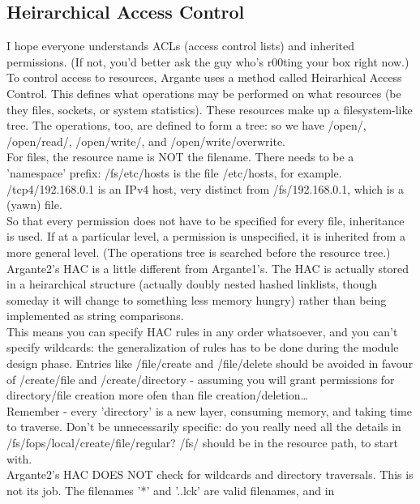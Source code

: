 \documentclass[a4paper,oneside,openany]{book}
\begin{document}
\subsection{Heirarchical Access Control}
I hope everyone understands ACLs (access control lists) and inherited permissions.
(If not, you'd better ask the guy who's r00ting your box right now.)
\smallskip\\
To control access to resources, Argante uses a method called Heirarhical
Access Control. This defines what operations may be performed on what
resources (be they files, sockets, or system statistics). These resources
make up a filesystem-like tree. The operations, too, are defined to form
a tree: so we have /open/, /open/read/, /open/write/, and
/open/write/overwrite.
\smallskip\\
For files, the resource name is NOT the filename. There needs to be a
'namespace' prefix: /fs/etc/hosts is the file /etc/hosts, for example.
/tcp4/192.168.0.1 is an IPv4 host, very distinct from /fs/192.168.0.1,
which is a (yawn) file.
\smallskip\\
So that every permission does not have to be specified for every file,
inheritance is used. If at a particular level, a permission is unspecified,
it is inherited from a more general level. (The operations tree is searched
before the resource tree.)
\smallskip\\
Argante2's HAC is a little different from Argante1's. The HAC is actually
stored in a heirarchical structure (actually doubly nested hashed linklists,
though someday it will change to something less memory hungry) rather than
being implemented as string comparisons.
\smallskip\\
This means you can specify HAC rules in any order whatsoever, and you can't
specify wildcards: the generalization of rules has to be done during the
module design phase. Entries like /file/create and /file/delete should be
avoided in favour of /create/file and /create/directory - assuming you will
grant permissions for directory/file creation more ofen than file
creation/deletion\ldots
\smallskip\\
Remember - every 'directory' is a new layer, consuming memory, and taking
time to traverse. Don't be unnecessarily specific: do you really need all
the details in /fs/fops/local/create/file/regular? /fs/ should be in the
resource path, to start with.
\smallskip\\
Argante2's HAC DOES NOT check for wildcards and directory traversals. This
is not its job. The filenames '*' and '..lck' are valid filenames, and in
\end{document}
